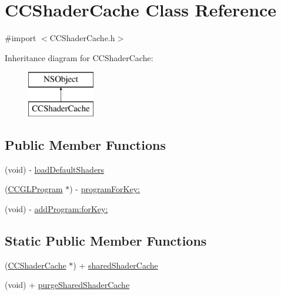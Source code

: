 \hypertarget{interface_c_c_shader_cache}{\section{C\-C\-Shader\-Cache Class Reference}
\label{interface_c_c_shader_cache}
}


{\ttfamily \#import $<$C\-C\-Shader\-Cache.\-h$>$}

Inheritance diagram for C\-C\-Shader\-Cache\-:\begin{figure}[H]
\begin{center}
\leavevmode
\includegraphics[height=2.000000cm]{interface_c_c_shader_cache}
\end{center}
\end{figure}
\subsection*{Public Member Functions}
\begin{DoxyCompactItemize}
\item 
(void) -\/ \hyperlink{interface_c_c_shader_cache_a641a9ae1e8fdac164a5be2c39905b569}{load\-Default\-Shaders}
\item 
(\hyperlink{interface_c_c_g_l_program}{C\-C\-G\-L\-Program} $\ast$) -\/ \hyperlink{interface_c_c_shader_cache_a904923d753ab17eebb70e4b01afc76bf}{program\-For\-Key\-:}
\item 
(void) -\/ \hyperlink{interface_c_c_shader_cache_a1d508324181635cabe6173aeb4ffc784}{add\-Program\-:for\-Key\-:}
\end{DoxyCompactItemize}
\subsection*{Static Public Member Functions}
\begin{DoxyCompactItemize}
\item 
(\hyperlink{interface_c_c_shader_cache}{C\-C\-Shader\-Cache} $\ast$) + \hyperlink{interface_c_c_shader_cache_aa3557f1af20edfd0c42053111240b598}{shared\-Shader\-Cache}
\item 
(void) + \hyperlink{interface_c_c_shader_cache_af76be5c725ba6dbedd95abb32b523d86}{purge\-Shared\-Shader\-Cache}
\end{DoxyCompactItemize}
